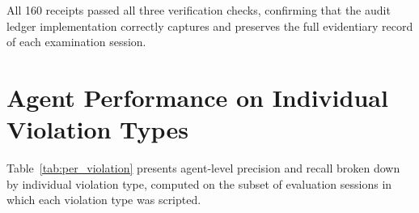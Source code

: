 All 160 receipts passed all three verification checks, confirming that the audit ledger implementation correctly captures and preserves the full evidentiary record of each examination session.

\section{Agent Performance on Individual Violation Types}

Table~\ref{tab:per_violation} presents agent-level precision and recall broken down by individual violation type, computed on the subset of evaluation sessions in which each violation type was scripted.

\begin{table}[htbp]
    \centering
    \caption{Per-violation detection performance by responsible agent. ``Sessions'' indicates the number of evaluation sessions in which the violation was scripted.}
    \label{tab:per_violation}
\end{table}

